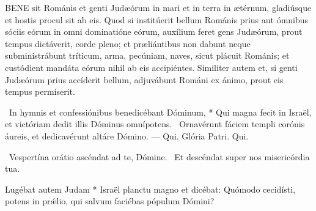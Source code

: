 
\lettrine[lines=2]{B}{ENE} sit Románis et genti Judæórum in mari et in terra in ætérnum, gladiúsque et hostis procul sit ab eis. Quod si institúerit bellum Románis prius aut ómnibus sóciis eórum in omni dominatióne eórum, auxílium feret gens Judæórum, prout tempus dictáverit, corde pleno; et præliántibus non dabunt neque subministrábunt tríticum, arma, pecúniam, naves, sicut plácuit Románis; et custódient mandáta eórum nihil ab eis accipiéntes. Similiter autem et, si genti Judæórum prius accíderit bellum, adjuvábunt Románi ex ánimo, prout eis tempus permíserit.

\R\ In hymnis et confessiónibus benedicébant Dóminum, * Qui magna fecit in Israël, et victóriam dedit illis Dóminus omnípotens. \V\ Ornavérunt fáciem templi corónis áureis, et dedicavérunt altáre Dómino. — Qui. Glória Patri. Qui.


\V\ Vespertína orátio ascéndat ad te, Dómine. \R\ Et descéndat super nos misericórdia tua.

 Lugébat autem Judam * Israël planctu magno et dicébat: Quómodo cecidísti, potens in prǽlio, qui salvum faciébas pópulum Dómini?





